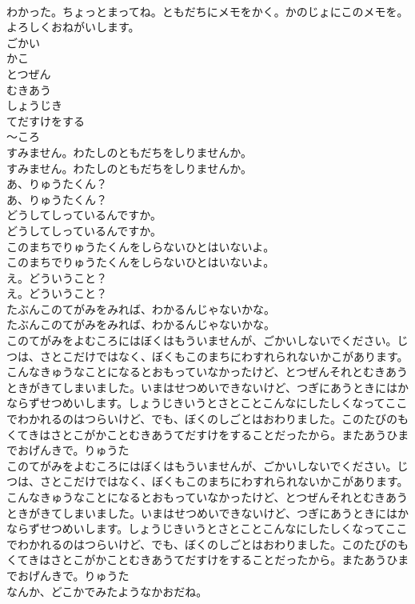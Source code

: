 \documentclass[8pt]{extreport}
\begin{document}
\begin{CJK}{UTF8}{min}
\\	わかった。ちょっとまってね。ともだちにメモをかく。かのじょにこのメモを。よろしくおねがいします。
\\	ごかい
\\	かこ
\\	とつぜん
\\	むきあう
\\	しょうじき
\\	てだすけをする
\\	〜ころ
\\	すみません。わたしのともだちをしりませんか。
\\	すみません。わたしのともだちをしりませんか。
\\	あ、りゅうたくん？
\\	あ、りゅうたくん？
\\	どうしてしっているんですか。
\\	どうしてしっているんですか。
\\	このまちでりゅうたくんをしらないひとはいないよ。
\\	このまちでりゅうたくんをしらないひとはいないよ。
\\	え。どういうこと？
\\	え。どういうこと？
\\	たぶんこのてがみをみれば、わかるんじゃないかな。
\\	たぶんこのてがみをみれば、わかるんじゃないかな。
\\	このてがみをよむころにはぼくはもういませんが、ごかいしないでください。じつは、さとこだけではなく、ぼくもこのまちにわすれられないかこがあります。こんなきゅうなことになるとおもっていなかったけど、とつぜんそれとむきあうときがきてしまいました。いまはせつめいできないけど、つぎにあうときにはかならずせつめいします。しょうじきいうとさとことこんなにしたしくなってここでわかれるのはつらいけど、でも、ぼくのしごとはおわりました。このたびのもくてきはさとこがかことむきあうてだすけをすることだったから。またあうひまでおげんきで。りゅうた
\\	このてがみをよむころにはぼくはもういませんが、ごかいしないでください。じつは、さとこだけではなく、ぼくもこのまちにわすれられないかこがあります。こんなきゅうなことになるとおもっていなかったけど、とつぜんそれとむきあうときがきてしまいました。いまはせつめいできないけど、つぎにあうときにはかならずせつめいします。しょうじきいうとさとことこんなにしたしくなってここでわかれるのはつらいけど、でも、ぼくのしごとはおわりました。このたびのもくてきはさとこがかことむきあうてだすけをすることだったから。またあうひまでおげんきで。りゅうた
\\	なんか、どこかでみたようなかおだね。

\end{CJK}
\end{document}
